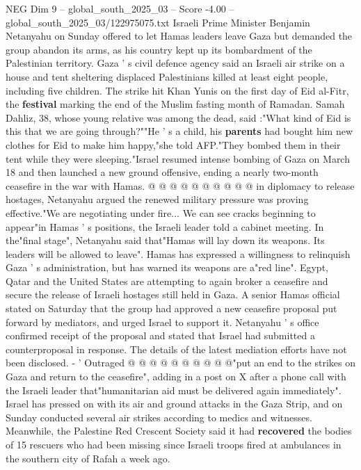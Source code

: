 \begin{textsample}{NEG Dim 9 – global\_south\_2025\_03 – Score -4.00 – global\_south\_2025\_03/122975075.txt}  \label{ex:f9_neg_397}
Israeli Prime Minister Benjamin Netanyahu on Sunday offered to let Hamas leaders leave Gaza but demanded the group abandon its arms, as his country kept up its bombardment of the Palestinian territory.
Gaza ' s civil defence agency said an Israeli air strike on a house and tent sheltering displaced Palestinians killed at least eight people, including five children.
The strike hit Khan Yunis on the first day of Eid al-Fitr, the \textbf{festival} marking the end of the Muslim fasting month of Ramadan.
Samah Dahliz, 38, whose young relative was among the dead, said :"What kind of Eid is this that we are going through?""He ' s a child, his \textbf{parents} had bought him new clothes for Eid to make him happy,"she told AFP."They bombed them in their tent while they were sleeping."Israel resumed intense bombing of Gaza on March 18 and then launched a new ground offensive, ending a nearly two-month ceasefire in the war with Hamas. @ @ @ @ @ @ @ @ @ @ in diplomacy to release hostages, Netanyahu argued the renewed military pressure was proving effective."We are negotiating under fire...
We can see cracks beginning to appear"in Hamas ' s positions, the Israeli leader told a cabinet meeting.
In the"final stage", Netanyahu said that"Hamas will lay down its weapons.
Its leaders will be allowed to leave".
Hamas has expressed a willingness to relinquish Gaza ' s administration, but has warned its weapons are a"red line".
Egypt, Qatar and the United States are attempting to again broker a ceasefire and secure the release of Israeli hostages still held in Gaza.
A senior Hamas official stated on Saturday that the group had approved a new ceasefire proposal put forward by mediators, and urged Israel to support it.
Netanyahu ' s office confirmed receipt of the proposal and stated that Israel had submitted a counterproposal in response.
The details of the latest mediation efforts have not been disclosed. - ' Outraged @ @ @ @ @ @ @ @ @ @"put an end to the strikes on Gaza and return to the ceasefire", adding in a post on X after a phone call with the Israeli leader that"humanitarian aid must be delivered again immediately".
Israel has pressed on with its air and ground attacks in the Gaza Strip, and on Sunday conducted several air strikes according to medics and witnesses.
Meanwhile, the Palestine Red Crescent Society said it had \textbf{recovered} the bodies of 15 rescuers who had been missing since Israeli troops fired at ambulances in the southern city of Rafah a week ago.

\end{textsample}
